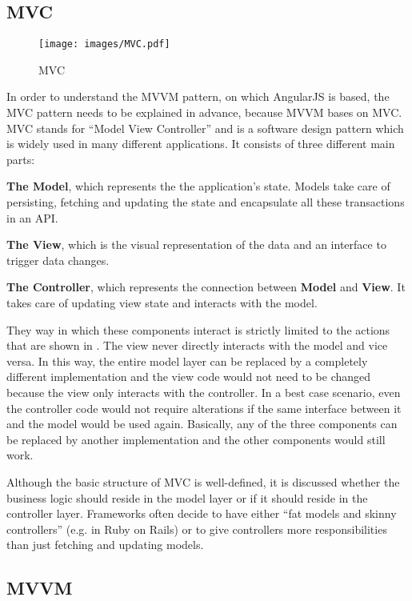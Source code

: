 \subsection{MVC}
\label{subsec:mvc}

\begin{figure}[htb]
  \centerline{\texttt{[image: images/MVC.pdf]}}
  \caption[MVC]{MVC}
  \label{fig:mvc}
\end{figure}

In order to understand the MVVM pattern, on which AngularJS is based, the MVC pattern needs to be explained in advance, because MVVM bases on MVC. MVC stands for ``Model View Controller'' and is a software design pattern which is widely used in many different applications. It consists of three different main parts:

\textbf{The Model}, which represents the the application's state. Models take care of persisting, fetching and updating the state and encapsulate all these transactions in an API.

\textbf{The View}, which is the visual representation of the data and an interface to trigger data changes.

\textbf{The Controller}, which represents the connection between \textbf{Model} and \textbf{View}. It takes care of updating view state and interacts with the model.

They way in which these components interact is strictly limited to the actions that are shown in . The view never directly interacts with the model and vice versa. In this way, the entire model layer can be replaced by a completely different implementation and the view code would not need to be changed because the view only interacts with the controller. In a best case scenario, even the controller code would not require alterations if the same interface between it and the model would be used again. Basically, any of the three components can be replaced by another implementation and the other components would still work.

Although the basic structure of MVC is well-defined, it is discussed whether the business logic should reside in the model layer or if it should reside in the controller layer. Frameworks often decide to have either ``fat models and skinny controllers'' (e.g. in Ruby on Rails) or to give controllers more responsibilities than just fetching and updating models.

\subsection{MVVM}
\label{subsec:mvvm}

